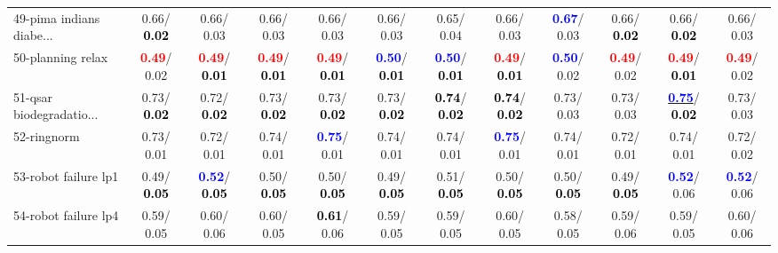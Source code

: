 \begin{table}[h]
\begin{center}
{\begin{tabular}{lc|c|c|c|c|c|c|c|c|c|c}
49-pima indians diabe... &   0.66/\textcolor{black}{\textbf{  0.02}} &   0.66/  0.03 &   0.66/  0.03 &   0.66/  0.03 &   0.66/  0.03 &   0.65/  0.04 &   0.66/  0.03 & \textcolor{blue}{\textbf{  0.67}}/  0.03 &   0.66/\textcolor{black}{\textbf{  0.02}} &   0.66/\textcolor{black}{\textbf{  0.02}} &   0.66/  0.03 \\
50-planning relax & \textcolor{red}{\textbf{  0.49}}/  0.02 & \textcolor{red}{\textbf{  0.49}}/\textcolor{black}{\textbf{  0.01}} & \textcolor{red}{\textbf{  0.49}}/\textcolor{black}{\textbf{  0.01}} & \textcolor{red}{\textbf{  0.49}}/\textcolor{black}{\textbf{  0.01}} & \textcolor{blue}{\textbf{  0.50}}/\textcolor{black}{\textbf{  0.01}} & \textcolor{blue}{\textbf{  0.50}}/\textcolor{black}{\textbf{  0.01}} & \textcolor{red}{\textbf{  0.49}}/\textcolor{black}{\textbf{  0.01}} & \textcolor{blue}{\textbf{  0.50}}/  0.02 & \textcolor{red}{\textbf{  0.49}}/  0.02 & \textcolor{red}{\textbf{  0.49}}/\textcolor{black}{\textbf{  0.01}} & \textcolor{red}{\textbf{  0.49}}/  0.02 \\
51-qsar biodegradatio... &   0.73/\textcolor{black}{\textbf{  0.02}} &   0.72/\textcolor{black}{\textbf{  0.02}} &   0.73/\textcolor{black}{\textbf{  0.02}} &   0.73/\textcolor{black}{\textbf{  0.02}} &   0.73/\textcolor{black}{\textbf{  0.02}} & \textcolor{black}{\textbf{  0.74}}/\textcolor{black}{\textbf{  0.02}} & \textcolor{black}{\textbf{  0.74}}/\textcolor{black}{\textbf{  0.02}} &   0.73/  0.03 &   0.73/  0.03 & \underline{\textcolor{blue}{\textbf{  0.75}}}/\textcolor{black}{\textbf{  0.02}} &   0.73/  0.03 \\
52-ringnorm &   0.73/  0.01 &   0.72/  0.01 &   0.74/  0.01 & \textcolor{blue}{\textbf{  0.75}}/  0.01 &   0.74/  0.01 &   0.74/  0.01 & \textcolor{blue}{\textbf{  0.75}}/  0.01 &   0.74/  0.01 &   0.72/  0.01 &   0.74/  0.01 &   0.72/  0.02 \\
53-robot failure lp1 &   0.49/\textcolor{black}{\textbf{  0.05}} & \textcolor{blue}{\textbf{  0.52}}/\textcolor{black}{\textbf{  0.05}} &   0.50/\textcolor{black}{\textbf{  0.05}} &   0.50/\textcolor{black}{\textbf{  0.05}} &   0.49/\textcolor{black}{\textbf{  0.05}} &   0.51/\textcolor{black}{\textbf{  0.05}} &   0.50/\textcolor{black}{\textbf{  0.05}} &   0.50/\textcolor{black}{\textbf{  0.05}} &   0.49/\textcolor{black}{\textbf{  0.05}} & \textcolor{blue}{\textbf{  0.52}}/  0.06 & \textcolor{blue}{\textbf{  0.52}}/  0.06 \\ \hline
54-robot failure lp4 &   0.59/  0.05 &   0.60/  0.06 &   0.60/  0.05 & \textcolor{black}{\textbf{  0.61}}/  0.06 &   0.59/  0.05 &   0.59/  0.05 &   0.60/  0.05 &   0.58/  0.05 &   0.59/  0.06 &   0.59/  0.05 &   0.60/  0.06 \\

\end{tabular}}
\end{center}
\end{table}
